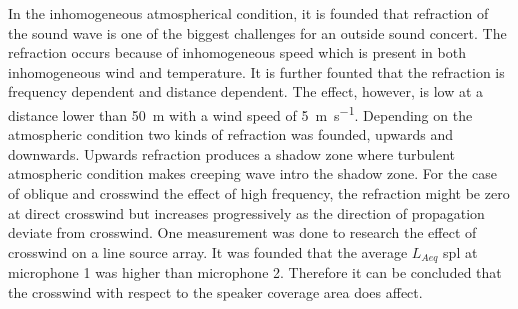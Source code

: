 In the inhomogeneous atmospherical condition, it is founded that refraction of the sound wave is one of the biggest challenges for an outside sound concert. The refraction occurs because of inhomogeneous speed which is present in both inhomogeneous wind and temperature. It is further founted that the refraction is frequency dependent and distance dependent. The effect, however, is low at a distance lower than \SI{50}{\meter} with a wind speed of \SI{5}{\meter\per\second}. Depending on the atmospheric condition two kinds of refraction was founded, upwards and downwards. Upwards refraction produces a shadow zone where turbulent atmospheric condition makes creeping wave intro the shadow zone. For the case of oblique and crosswind the effect of high frequency, the refraction might be zero at direct crosswind but increases progressively as the direction of propagation deviate from crosswind. One measurement was done to research the effect of crosswind on a line source array. It was founded that the average $L_{Aeq}$ \gls{spl} at microphone 1 was  higher than microphone 2. Therefore it can be concluded that the crosswind with respect to the speaker coverage area does affect. 
 

  

